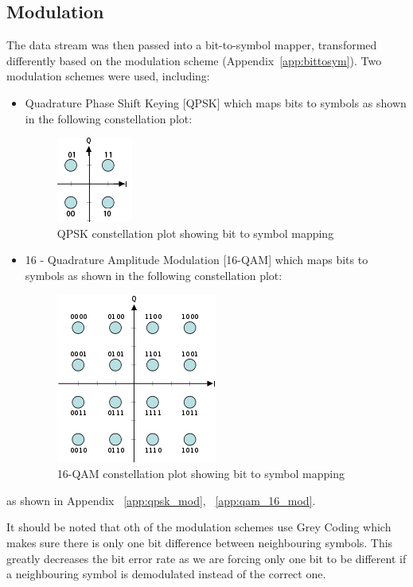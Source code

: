 \documentclass[]{article}
\begin{document}
\subsection{Modulation}
\label{sec:modulation}
The data stream was then passed into a bit-to-symbol mapper, transformed differently based on the modulation scheme  (Appendix~\ref{app:bittosym}).  Two  modulation schemes were used, including:
\begin{itemize}
\item Quadrature Phase Shift Keying [QPSK] which maps bits to symbols  as shown in the following constellation plot:

	\begin{figure}[H]
	\centering
	\includegraphics[width=.2\textwidth]{QPSK.jpg}
	\caption{QPSK constellation plot showing bit to 		symbol mapping}
	\end{figure}

\item 16 - Quadrature Amplitude Modulation [16-QAM] which maps bits to symbols as shown in the following constellation plot:

	\begin{figure}[H]
	\centering
	\includegraphics[width=.3\textwidth]	{16QAM.jpg}
	\caption{16-QAM constellation plot showing bit to 	symbol mapping}
	\end{figure}

\end{itemize}

as shown in Appendix ~\ref{app:qpsk_mod}, ~\ref{app:qam_16_mod}.

It should be noted that oth of the modulation schemes use Grey Coding which makes sure there is only one bit difference between neighbouring symbols. This greatly decreases the bit error rate as we are forcing only one bit to be different if a neighbouring symbol is demodulated instead of the correct one. 
\end{document}
